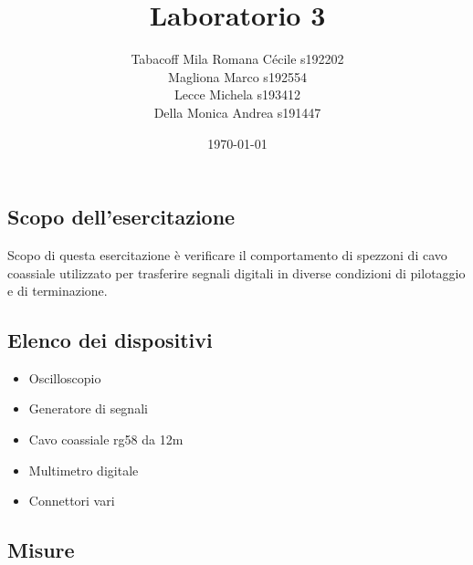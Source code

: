 \documentclass[a4paper]{article}
\begin{document}
\title{Laboratorio 3}
\author{
        Tabacoff Mila Romana Cécile s192202\\
        Magliona Marco s192554 \\
        Lecce Michela s193412\\
        Della Monica Andrea s191447}

\date{\today}
\maketitle

\newpage

\begin{tcolorbox}[breakable,colback=cyan,colframe=cyan]
\section*{Scopo dell'esercitazione}
\end{tcolorbox}

Scopo di questa esercitazione è verificare il comportamento di spezzoni di cavo coassiale utilizzato per trasferire segnali digitali in diverse condizioni di pilotaggio e di terminazione.

\begin{tcolorbox}[breakable,colback=cyan,colframe=cyan]
\section*{Elenco dei dispositivi}
\end{tcolorbox}

\begin{itemize}
\item Oscilloscopio
\item Generatore di segnali
\item Cavo coassiale rg58 da 12m
\item Multimetro digitale
\item Connettori vari
\end{itemize}

\begin{tcolorbox}[breakable,colback=cyan,colframe=cyan]
\section*{Misure}
\end{tcolorbox}
\end{document}
